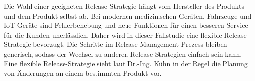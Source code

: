 Die Wahl einer geeigneten Release-Strategie hängt vom Hersteller des Produkts und dem Produkt selbst ab. Bei modernen medizinischen Geräten, Fahrzeuge und IoT Geräte sind Fehlerbehebung und neue Funktionen für einen besseren Service für die Kunden unerlässlich. Daher wird in dieser Fallstudie eine flexible Release-Strategie bevorzugt. Die Schritte im Release-Management-Prozess bleiben generisch, sodass der Wechsel zu anderen Release-Strategien einfach sein kann. Eine flexible Release-Strategie sieht laut Dr.-Ing. Kühn in der Regel die Planung von Änderungen an einem bestimmten Produkt vor\cite{doktor-thesis}.


